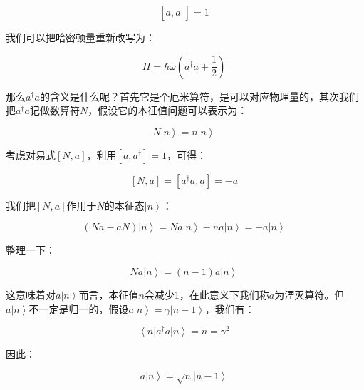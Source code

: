 \begin{equation}
\left[ a, a^\dagger  \right] = 1~
\end{equation}

我们可以把哈密顿量重新改写为：

\begin{equation}
H = \hbar \omega \left( a^\dagger a + \frac{1}{2} \right)~
\end{equation}

那么$a^\dagger a$的含义是什么呢？首先它是个厄米算符，是可以对应物理量的，其次我们把$a^\dagger a$记做数算符$N$，假设它的本征值问题可以表示为：

\begin{equation}
N \left| n \right\rangle = n \left| n \right\rangle~
\end{equation}

考虑对易式$\left[ N, a \right]$，利用$\left[ a, a^\dagger \right] = 1$，可得：

\begin{equation}
\left[ N, a \right]  = \left[ a^\dagger a , a \right] = - a~
\end{equation}

我们把$\left[ N, a \right] $作用于$N$的本征态$\left| n \right\rangle$：

\begin{equation}
\left( N a - a N \right) \left| n \right\rangle = N a \left| n \right\rangle - n a \left| n \right\rangle = - a \left| n \right\rangle~
\end{equation}

整理一下：

\begin{equation}
N a \left| n \right\rangle = (n -1) a \left| n \right\rangle~
\end{equation}

这意味着对$a \left| n \right\rangle$而言，本征值$n$会减少1，在此意义下我们称$a$为湮灭算符。但$a \left| n \right\rangle$不一定是归一的，假设$a \left| n \right\rangle = \gamma \left| n -1 \right\rangle$，我们有：

\begin{equation}
\left\langle n \right| a^\dagger a \left| n \right\rangle = n = \gamma^2~
\end{equation}

因此：

\begin{equation}
a \left| n \right\rangle = \sqrt{n} \left| n -1 \right\rangle~
\end{equation}


